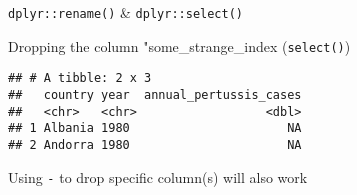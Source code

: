 \documentclass[ignorenonframetext,]{beamer}
\newenvironment{Shaded}{\begin{snugshade}}{\end{snugshade}}
\newcommand{\DecValTok}[1]{\textcolor[rgb]{0.00,0.00,0.81}{#1}}
\newcommand{\KeywordTok}[1]{\textcolor[rgb]{0.13,0.29,0.53}{\textbf{#1}}}
\newcommand{\NormalTok}[1]{#1}
\newcommand{\OperatorTok}[1]{\textcolor[rgb]{0.81,0.36,0.00}{\textbf{#1}}}
\newcommand{\StringTok}[1]{\textcolor[rgb]{0.31,0.60,0.02}{#1}}
\begin{document}
\begin{frame}[fragile]{\texttt{dplyr::rename()} \&
\texttt{dplyr::select()}}
\begin{block}{Dropping the column "some\_strange\_index
(\texttt{select()})}
\begin{Shaded}
\begin{Highlighting}[]
{\NormalTok{pertussis_data_tidy }\OperatorTok{%>%}\StringTok{ }\KeywordTok{head}\NormalTok{(}\DecValTok{2}\NormalTok{)}
\end{Highlighting}
\end{Shaded}

\begin{verbatim}
## # A tibble: 2 x 3
##   country year  annual_pertussis_cases
##   <chr>   <chr>                  <dbl>
## 1 Albania 1980                      NA
## 2 Andorra 1980                      NA
\end{verbatim}

\end{block}

\begin{block}{Using \texttt{-} to drop specific column(s) will also
work}

\begin{Shaded}
\end{Shaded}

\end{block}

\end{frame}
\end{document}
